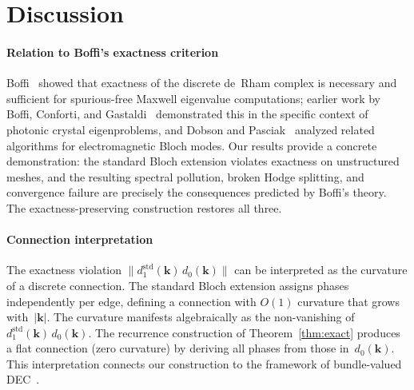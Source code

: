 \documentclass[preprint,12pt]{elsarticle}
\begin{document}
\section{Discussion}
\label{sec:discussion}

\paragraph{Relation to Boffi's exactness criterion}
Boffi~\cite{Boffi2010} showed that exactness of the discrete de~Rham complex is necessary and sufficient for spurious-free Maxwell eigenvalue computations; earlier work by Boffi, Conforti, and Gastaldi~\cite{Boffi2006} demonstrated this in the specific context of photonic crystal eigenproblems, and Dobson and Pasciak~\cite{Dobson2001} analyzed related algorithms for electromagnetic Bloch modes. Our results provide a concrete demonstration: the standard Bloch extension violates exactness on unstructured meshes, and the resulting spectral pollution, broken Hodge splitting, and convergence failure are precisely the consequences predicted by Boffi's theory. The exactness-preserving construction restores all three.

\paragraph{Connection interpretation}
The exactness violation $\|d_1^{\mathrm{std}}(\mathbf{k})\,d_0(\mathbf{k})\|$ can be interpreted as the curvature of a discrete connection. The standard Bloch extension assigns phases independently per edge, defining a connection with $O(1)$ curvature that grows with~$|\mathbf{k}|$. The curvature manifests algebraically as the non-vanishing of $d_1^{\mathrm{std}}(\mathbf{k})\,d_0(\mathbf{k})$. The recurrence construction of Theorem~\ref{thm:exact} produces a flat connection (zero curvature) by deriving all phases from those in~$d_0(\mathbf{k})$. This interpretation connects our construction to the framework of bundle-valued DEC~\cite{Braune2024}.
\end{document}
